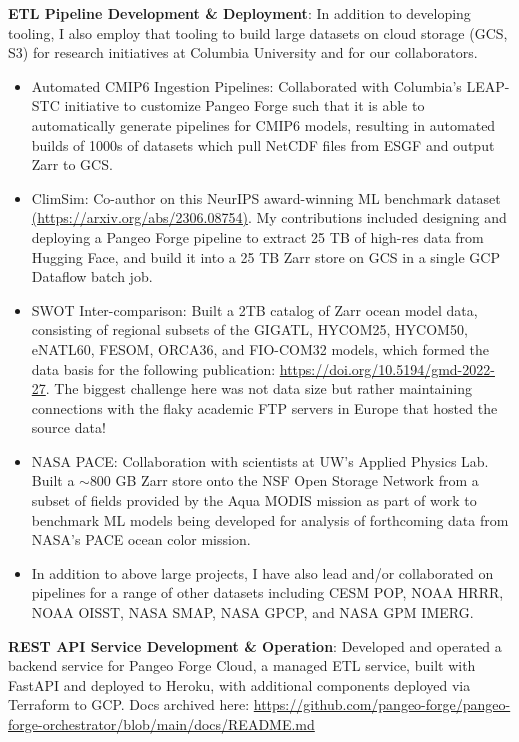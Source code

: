 \documentclass[letterpaper,11pt]{article}
\newcommand{\resumeItem}[2]{
  \item[]\small{
    \textbf{#1}{: #2 \vspace{-2pt}}
  }
}
\begin{document}
        \resumeItem{ETL Pipeline Development \& Deployment}
          {In addition to developing tooling, I also employ that tooling to build large
          datasets on cloud storage (GCS, S3) for research initiatives at Columbia University and for our collaborators.}
          \begin{itemize}
            \item Automated CMIP6 Ingestion Pipelines: Collaborated with Columbia's LEAP-STC initiative to
            customize Pangeo Forge such that it is able to automatically generate pipelines for CMIP6 models,
            resulting in automated builds of 1000s of datasets which pull NetCDF files from ESGF and output Zarr to GCS.
            \item ClimSim: Co-author on this NeurIPS award-winning ML benchmark dataset
            \href{https://arxiv.org/abs/2306.08754}{(https://arxiv.org/abs/2306.08754)}.
            My contributions included designing and deploying a Pangeo Forge pipeline to extract 25 TB of high-res data
            from Hugging Face, and build it into a 25 TB Zarr store on GCS in a single GCP Dataflow batch job.
            \item SWOT Inter-comparison: Built a 2TB catalog of Zarr ocean model data, consisting of
            regional subsets of the GIGATL, HYCOM25, HYCOM50, eNATL60, FESOM, ORCA36, and FIO-COM32 models,
            which formed the data basis for the following publication: \href{https://doi.org/10.5194/gmd-2022-27}{https://doi.org/10.5194/gmd-2022-27}.
            The biggest challenge here was not data size but rather maintaining connections with the flaky academic FTP servers in Europe
            that hosted the source data!
            \item NASA PACE: Collaboration with scientists at UW's Applied Physics Lab.
            Built a $\sim$800 GB Zarr store onto the NSF Open Storage Network from a subset of fields provided by the Aqua MODIS mission
            as part of work to benchmark ML models being developed for analysis of forthcoming data from
            NASA's PACE ocean color mission.
            \item In addition to above large projects, I have also lead and/or collaborated on pipelines for a range of other datasets
            including CESM POP, NOAA HRRR, NOAA OISST, NASA SMAP, NASA GPCP, and NASA GPM IMERG.
          \end{itemize}
        \resumeItem{REST API Service Development \& Operation}
          {Developed and operated a backend service for Pangeo Forge Cloud,
          a managed ETL service, built with FastAPI and deployed to Heroku,
          with additional components deployed via Terraform to GCP.
          Docs archived here: \href{https://github.com/pangeo-forge/pangeo-forge-orchestrator/blob/main/docs/README.md}
          {https://github.com/pangeo-forge/pangeo-forge-orchestrator/blob/main/docs/README.md}
          }
\end{document}
